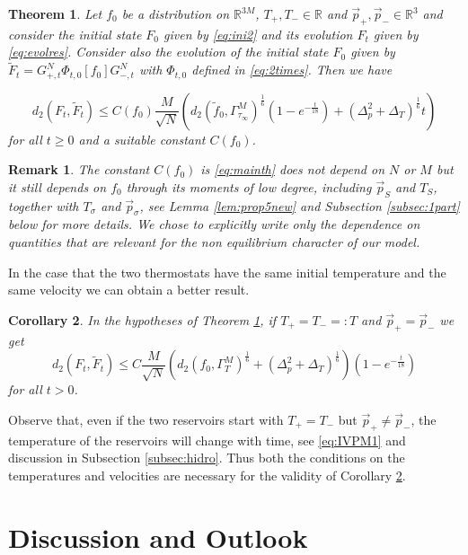 \documentclass{article}
\newcommand*\R{ \mathds{R} }
\newtheorem{Remark}{Remark}
\newtheorem{mythm}{Theorem}%
\newtheorem{corollary}[mythm]{Corollary}
\begin{document}
\begin{mythm}\label{thm:2thermo}
Let $f_0$ be a distribution on $\R^{3M}$, $T_+,T_-\in\R$ and $\vec p_+, \vec p_-\in \R^3$ and consider the initial state
$F_0$ given by \eqref{eq:ini2} and its evolution $F_t$ given by \eqref{eq:evolres}. Consider also the evolution of the
initial state $F_0$ given by $\widetilde F_t=G_{+,t}^N\Phi_{t,0} [f_0]G_{-,t}^N$ with $\Phi_{t,0}$ defined in
\eqref{eq:2times}. Then we have

\begin{equation}\label{eq:mainth}
d_2(F_t, \widetilde F_t) \leq C(f_0)\frac M{\sqrt N}\left(d_2(\tilde f_0, \Gamma^M_{\tau_\infty})^{\frac 
16}\left(1-e^{-\frac t{18}}\right)+(\Delta_p^2+\Delta_T)^{\frac 16}t\right)
\end{equation}
for all $t\geq 0$ and a suitable constant $C(f_0)$.
\end{mythm}

\begin{Remark}
\emph{The constant $C(f_0)$ is \eqref{eq:mainth} does not depend on $N$ or $M$ but it still depends on $f_0$ through its
moments of low degree, including $\vec p_S$ and $T_S$, together with $T_\sigma$ and $\vec p_\sigma$, see Lemma
\ref{lem:prop5new} and Subsection \ref{subsec:1part} below for more details. We chose to explicitly write only the
dependence on quantities that are relevant for the non equilibrium character of our model. }
\end{Remark} 

In the case that the two thermostats have the same initial temperature and the same velocity we can obtain a better 
result.

\begin{corollary}\label{coro:1thermo}
In the hypotheses of Theorem \ref{thm:2thermo}, if $T_+=T_-=:T$ and $\vec p_+=\vec p_-$ we get
\[
d_2(F_t, \widetilde F_t) \leq  C\frac M{\sqrt N}\left(d_2(f_0, \Gamma_T^M)^{\frac 16}+(\Delta_p^2+\Delta_T)^{\frac 
16}\right)\left (1-e^{-\frac t{18}}\right)
\]
for all $t>0$.
\end{corollary} 

Observe that, even if the two reservoirs start with $T_+=T_-$ but $\vec p_+\not =\vec p_-$, the temperature of the
reservoirs will change with time, see \eqref{eq:IVPM1} and discussion in Subsection \ref{subsec:hidro}. Thus both the
conditions on the temperatures and velocities are necessary for the validity of Corollary \ref{coro:1thermo}.


\section{Discussion and Outlook}\label{sec:out}
\end{document}
